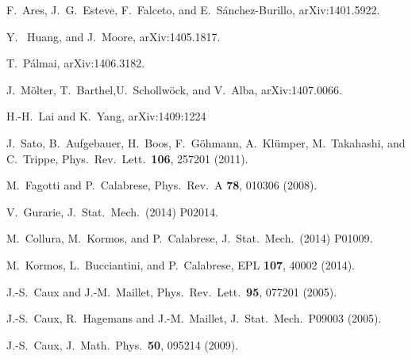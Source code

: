 \documentclass[twocolumn,superscriptaddress,prb,10pt]{revtex4-1}
\begin{document}
\begin{thebibliography}{99}
F.~Ares, J.~G.~Esteve, F.~Falceto, and E.~S\'anchez-Burillo, 
arXiv:1401.5922.

Y.~ Huang, and J.~Moore,  arXiv:1405.1817.

T.~P\'almai, arXiv:1406.3182.

J.~M\"olter, T.~Barthel,U.~Schollw\"ock, and V.~Alba, 
arXiv:1407.0066. 

H.-H.~Lai and K.~Yang, arXiv:1409:1224


J.~Sato, B.~Aufgebauer, H.~Boos, F.~G\"ohmann, A.~Kl\"umper, 
M.~Takahashi, and C.~Trippe, Phys.\ Rev.\ Lett.\ {\bf 106}, 257201 
(2011). 

M.~Fagotti and P.~Calabrese, Phys.\ Rev.\ A {\bf 78}, 010306 (2008).

V.~Gurarie, J.\ Stat.\ Mech.\ (2014) P02014. 

M.~Collura, M.~Kormos, and P.~Calabrese, J.\ Stat.\ Mech.\ (2014) P01009. 

M.~Kormos, L.~Bucciantini, and P.~Calabrese, EPL {\bf 107}, 40002 (2014). 

J.-S.~Caux and J.-M.~Maillet, Phys.\ Rev.\ Lett.\ {\bf 95}, 077201 (2005).

J.-S.~Caux, R.~Hagemans and J.-M.~Maillet, J.\ Stat.\ Mech.\ P09003 (2005). 

J.-S.~Caux, J.\ Math.\ Phys.\ {\bf 50}, 095214 (2009).


\end{thebibliography}
\end{document}

